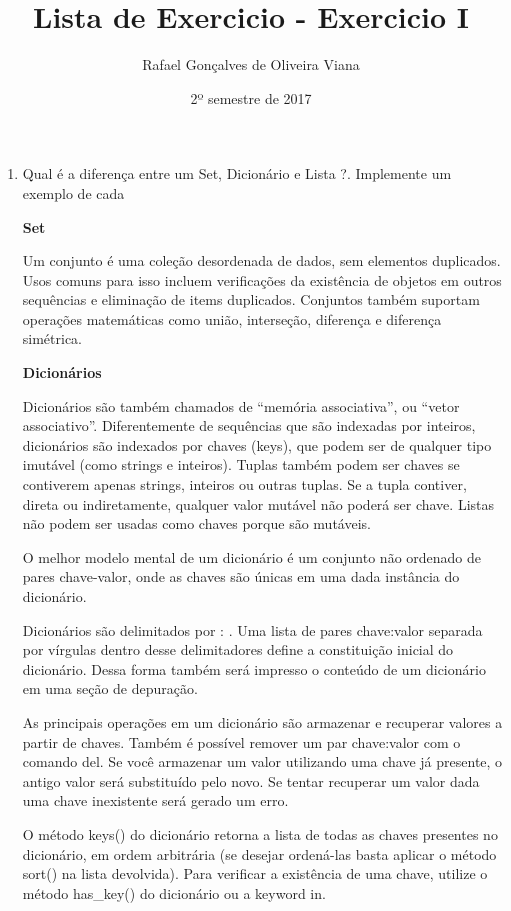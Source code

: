 \documentclass[12pt]{article}
\title{Lista de Exercicio  - Exercicio I }
\author{Rafael Gonçalves de  Oliveira Viana}
\date{2º semestre de 2017}
\begin{document}
\maketitle

\begin{enumerate}
\item Qual é a diferença entre um Set, Dicionário e Lista ?. Implemente um exemplo de cada

\textbf{Set}

Um conjunto é uma coleção desordenada de dados, sem elementos duplicados. Usos comuns para isso incluem verificações da existência de objetos em outros sequências e eliminação de items duplicados. Conjuntos também suportam operações matemáticas como união, interseção, diferença e diferença simétrica.

\textbf{Dicionários}

Dicionários são também chamados de ``memória associativa'', ou ``vetor associativo''. Diferentemente de sequências que são indexadas por inteiros, dicionários são indexados por chaves (keys), que podem ser de qualquer tipo imutável (como strings e inteiros). Tuplas também podem ser chaves se contiverem apenas strings, inteiros ou outras tuplas. Se a tupla contiver, direta ou indiretamente, qualquer valor mutável não poderá ser chave. Listas não podem ser usadas como chaves porque são mutáveis.

O melhor modelo mental de um dicionário é um conjunto não ordenado de pares chave-valor, onde as chaves são únicas em uma dada instância do dicionário.

Dicionários são delimitados por : {}. Uma lista de pares chave:valor separada por vírgulas dentro desse delimitadores define a constituição inicial do dicionário. Dessa forma também será impresso o conteúdo de um dicionário em uma seção de depuração.

As principais operações em um dicionário são armazenar e recuperar valores a partir de chaves. Também é possível remover um par chave:valor com o comando del. Se você armazenar um valor utilizando uma chave já presente, o antigo valor será substituído pelo novo. Se tentar recuperar um valor dada uma chave inexistente será gerado um erro.

O método keys() do dicionário retorna a lista de todas as chaves presentes no dicionário, em ordem arbitrária (se desejar ordená-las basta aplicar o método sort() na lista devolvida). Para verificar a existência de uma chave, utilize o método has\_key() do dicionário ou a keyword in.


\end{enumerate}
\end{document}
